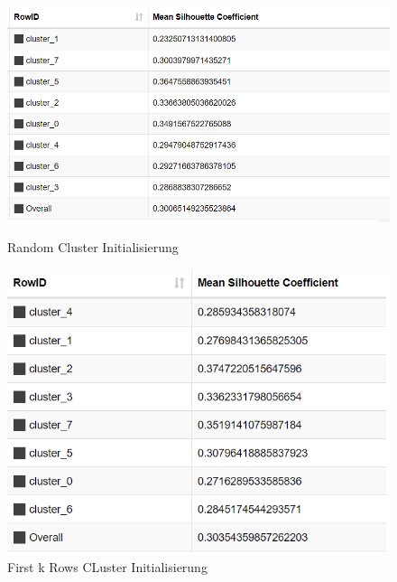 \documentclass[
	handout,
  	aspectratio=169
]{beamer}
\begin{document}
\begin{frame}
	\begin{figure}[!htb]
\includegraphics[scale=0.5]{../pictures/sil_mean.png}
			 \caption{Random Cluster Initialisierung}
		\endminipage\hfill
			\includegraphics[scale=0.5]{../pictures/sil_firstk.png}
			 \caption{First k Rows CLuster Initialisierung}
		\endminipage\hfill
	\end{figure}
	\end{frame}
	
\end{document}
